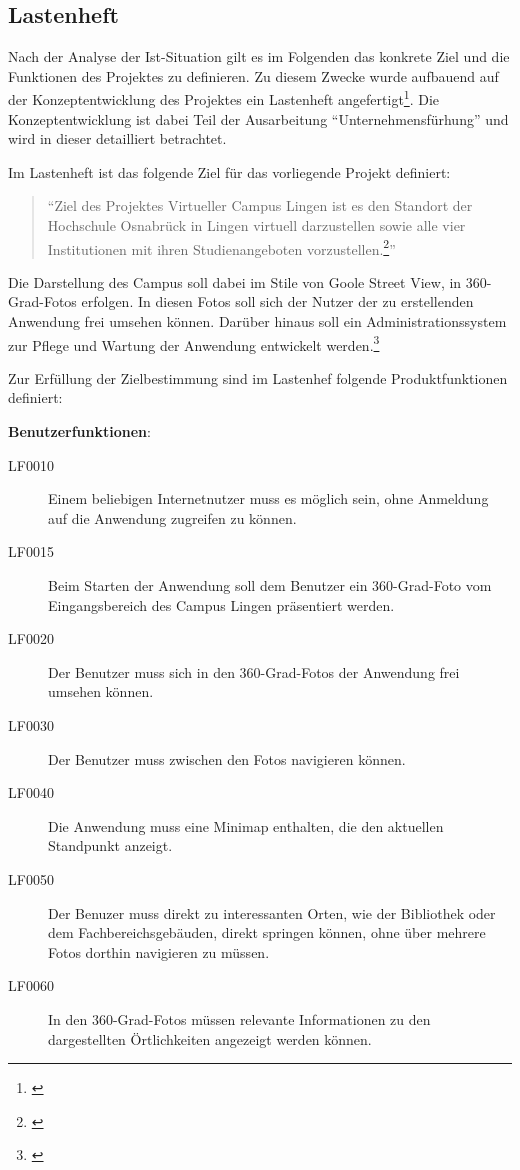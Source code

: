 \subsection{Lastenheft}
\label{sec:Lastenheft}

Nach der Analyse der Ist-Situation gilt es im Folgenden das konkrete Ziel und
die Funktionen des Projektes zu definieren. Zu diesem Zwecke wurde aufbauend auf
der Konzeptentwicklung des Projektes ein Lastenheft
angefertigt\footnote{\citet{lastenheft2013}}. Die Konzeptentwicklung ist
dabei Teil der Ausarbeitung "`Unternehmensfürhung"' und wird in dieser
detailliert betrachtet.

Im Lastenheft ist das folgende Ziel für das vorliegende Projekt definiert:

\begin{quote}
"`Ziel des Projektes Virtueller Campus Lingen ist es den Standort der Hochschule Osnabrück
in Lingen virtuell darzustellen sowie alle vier Institutionen mit ihren Studienangeboten
vorzustellen.\footnote{\citet[S.~1]{lastenheft2013}}"'
\end{quote}

Die Darstellung des Campus soll dabei im Stile von Goole Street View, in
360-Grad-Fotos erfolgen. In diesen Fotos soll sich der Nutzer der zu
erstellenden Anwendung frei umsehen können. Darüber hinaus soll ein
Administrationssystem zur Pflege und Wartung der Anwendung entwickelt
werden.\footnote{\citet[S.~1]{lastenheft2013}}

Zur Erfüllung der Zielbestimmung sind im Lastenhef folgende Produktfunktionen
definiert:

\textbf{Benutzerfunktionen}:

\begin{description}
  \item[LF0010] Einem beliebigen Internetnutzer muss es möglich sein, ohne
  Anmeldung auf die Anwendung zugreifen zu können.
  \item[LF0015] Beim Starten der Anwendung soll dem Benutzer ein 360-Grad-Foto
  vom Eingangsbereich des Campus Lingen präsentiert werden.
  \item[LF0020] Der Benutzer muss sich in den 360-Grad-Fotos der Anwendung frei
  umsehen können.
  \item[LF0030] Der Benutzer muss zwischen den Fotos navigieren können.
  \item[LF0040] Die Anwendung muss eine Minimap enthalten, die den
  aktuellen Standpunkt anzeigt.
  \item[LF0050] Der Benuzer muss direkt zu interessanten Orten, wie der
  Bibliothek oder dem Fachbereichsgebäuden, direkt springen können, ohne
  über mehrere Fotos dorthin navigieren zu müssen.
  \item[LF0060] In den 360-Grad-Fotos müssen relevante Informationen zu den
  dargestellten Ört\-lich\-kei\-ten angezeigt werden können.
\end{description}

